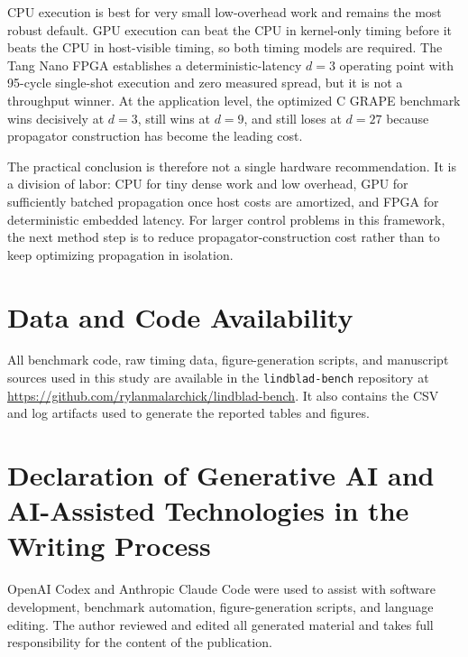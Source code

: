 \documentclass[3p,times,twocolumn]{elsarticle}
\begin{document}
CPU execution is best for very small low-overhead work and remains the most
robust default. GPU execution can beat the CPU in kernel-only timing before
it beats the CPU in host-visible timing, so both timing models are required.
The Tang Nano FPGA establishes a deterministic-latency $d=3$ operating point
with 95-cycle single-shot execution and zero measured spread, but it is not a
throughput winner. At the application level, the optimized C GRAPE benchmark
wins decisively at $d=3$, still wins at $d=9$, and still loses at $d=27$
because propagator construction has become the leading cost.

The practical conclusion is therefore not a single hardware recommendation.
It is a division of labor: CPU for tiny dense work and low overhead, GPU for
sufficiently batched propagation once host costs are amortized, and FPGA for
deterministic embedded latency. For larger control problems in this
framework, the next method step is to reduce propagator-construction cost
rather than to keep optimizing propagation in isolation.

\section*{Data and Code Availability}

All benchmark code, raw timing data, figure-generation scripts, and
manuscript sources used in this study are available in the
\texttt{lindblad-bench} repository at
\url{https://github.com/rylanmalarchick/lindblad-bench}. It also contains the
CSV and log artifacts used to generate the reported tables and figures.

\section*{Declaration of Generative AI and AI-Assisted Technologies in the Writing Process}

OpenAI Codex and Anthropic Claude Code were used to assist with software
development, benchmark automation, figure-generation scripts, and language
editing. The author reviewed and edited all generated material and takes full
responsibility for the content of the publication.



\end{document}
